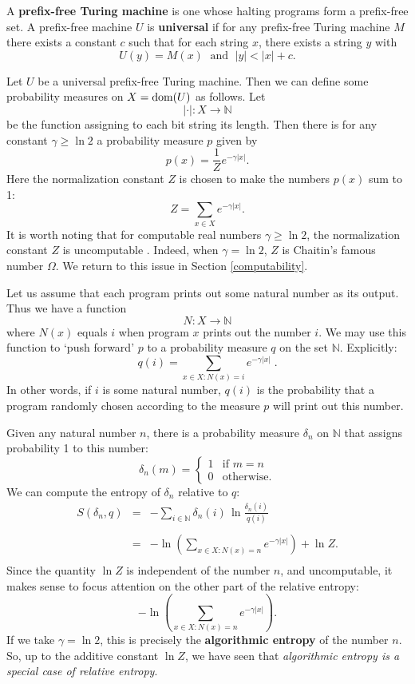 \documentclass[12pt,twoside,openright]{report}
\newcommand{\maps}{\colon}
\newcommand{\N}{\mathbb{N}}
\newcommand{\dom}{\mbox{\rm dom}}
\begin{document}
A \textbf{prefix-free Turing machine} is one whose halting programs form a prefix-free set.  A prefix-free machine $U$ is {\bf universal}
if for any prefix-free Turing machine $M$ there exists a constant
$c$ such that for each string $x$, there exists a string $y$ with
\[ U(y) = M(x) \; \mbox{ and } \; |y| < |x| + c. \]

Let $U$ be a universal prefix-free Turing machine.  Then we can define some probability measures on $X = \dom(U)$
as follows.   Let 
\[  |\cdot | \maps X \to \N \]
be the function assigning to each bit string its length. Then there is for any constant $\gamma \ge \ln 2$ a probability measure 
$p$ given by
\[   p(x) = \frac{1}{Z} e^{-\gamma |x|}. \]
Here the normalization constant $Z$ is chosen to make the numbers
$p(x)$ sum to 1:
\[   Z = \sum_{x \in X} e^{-\gamma |x|}  .\]
It is worth noting that for computable real numbers $\gamma \ge \ln 2$, the normalization constant $Z$ is uncomputable \cite{Tadaki2002}. Indeed, when $\gamma = \ln 2$, $Z$ is Chaitin's famous number $\Omega$. We return to this issue in Section \ref{computability}.

Let us assume that each program prints out some natural number as its output.   Thus we have a function
\[ N \maps X \to \N \]
where $N(x)$ equals $i$ when program $x$ prints out the number $i$. We may use this function to `push forward' $p$ to a probability measure
$q$ on the set $\N$.  Explicitly:
\[ 
   q(i) = \displaystyle {\sum_{x \in X : N(x) = i}} e^{-\gamma |x|} \; .
\]
In other words, if $i$ is some natural number, $q(i)$ is the probability that a program randomly chosen according to the measure
$p$ will print out this number.  

Given any natural number $n$, there is a probability measure
$\delta_n$ on $\N$ that assigns probability 1 to this number:
\[   \delta_n(m) = \left\{ \begin{array}{cl} 1 & \textrm{if } m = n \\
                              0 & \textrm{otherwise.}  
           \end{array} \right.
\]
We can compute the entropy of $\delta_n$ relative to $q$:
\begin{equation}
\label{relative.entropy}
\begin{array}{ccl} S(\delta_n,q) &=& 
\displaystyle{ -\sum_{i \in \N}  \delta_n(i) \, 
\ln \frac{\delta_n(i)}{q(i)}}   \\
\\ &=& \displaystyle{ -\ln \left( \sum_{x \in X \colon N(x) = n} 
e^{-\gamma |x|} \right) + \ln Z .}  \\
\end{array}
\end{equation}
Since the quantity $\ln Z$ is independent of the number $n$, and uncomputable, it makes sense to focus attention on the other part of the relative entropy:
\[  \displaystyle{ -\ln \left( \sum_{x \in X \colon N(x) = n} 
e^{-\gamma |x|} \right) .}  
\]
If we take $\gamma = \ln 2$, this is precisely the \textbf{algorithmic entropy} \cite{Chaitin1976,LevinZvonkin} of the number $n$.  So, up to the additive constant $\ln Z$, we have seen that \textit{algorithmic entropy is a special case of relative entropy}.  
\end{document}
